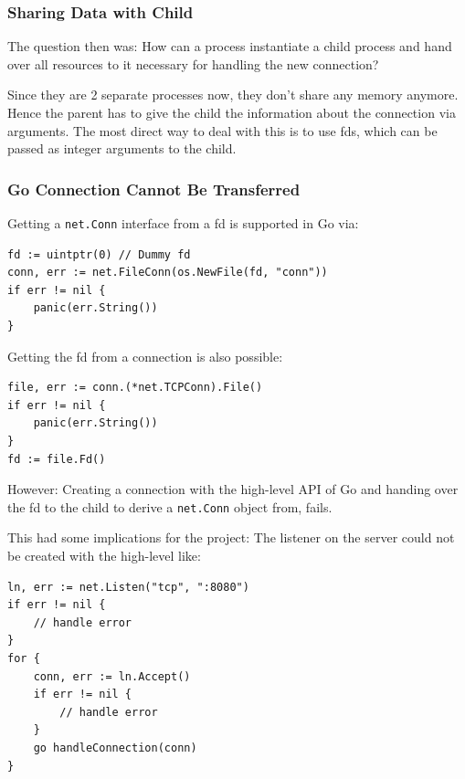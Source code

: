 \documentclass[10pt,a4paper,titlepage,twoside,english,final]{zhawreprt}
\begin{document}
\subsubsection{Sharing Data with Child}\label{sssec:SharingDataWithChild}
The question then was: How can a process instantiate a child process and hand over all resources to it necessary for handling the new connection?

Since they are 2 separate processes now, they don't share any memory anymore.
Hence the parent has to give the child the information about the connection via arguments.
The most direct way to deal with this is to use \glspl{fd}, which can be passed as integer arguments to the child.

\subsubsection{Go Connection Cannot Be Transferred}\label{sssec:GoConnectionCannotBeTransferred}
Getting a \texttt{net.Conn} interface from a \gls{fd} is supported in \gls{Go} via:
\setlistingGo
\begin{lstlisting}[caption={Getting a \texttt{net.Conn} interface from a \gls{fd}},label=lst:ConnFromFD]
fd := uintptr(0) // Dummy fd
conn, err := net.FileConn(os.NewFile(fd, "conn"))
if err != nil {
	panic(err.String())
}
\end{lstlisting}

Getting the \gls{fd} from a connection is also possible:
\setlistingGo
\begin{lstlisting}[caption={Getting the \gls{fd} from a \texttt{net.Conn} object},label=lst:FDFromConn]
file, err := conn.(*net.TCPConn).File()
if err != nil {
	panic(err.String())
}
fd := file.Fd()
\end{lstlisting}

However: Creating a connection with the high-level \gls{API} of \gls{Go} and handing over the \gls{fd} to the child to derive a \texttt{net.Conn} object from, fails.

This had some implications for the project: The listener on the server could not be created with the high-level like:
\setlistingGo
\begin{lstlisting}[caption={\gls{Go}'s high level \gls{API} for listener},label=lst:ListenForConn]
ln, err := net.Listen("tcp", ":8080")
if err != nil {
	// handle error
}
for {
	conn, err := ln.Accept()
	if err != nil {
		// handle error
	}
	go handleConnection(conn)
}
\end{lstlisting}
\end{document}
